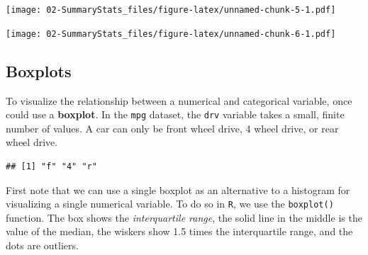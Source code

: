 \documentclass[]{book}
\newenvironment{Shaded}{\begin{snugshade}}{\end{snugshade}}
\newcommand{\KeywordTok}[1]{\textcolor[rgb]{0.13,0.29,0.53}{\textbf{#1}}}
\newcommand{\DataTypeTok}[1]{\textcolor[rgb]{0.13,0.29,0.53}{#1}}
\newcommand{\StringTok}[1]{\textcolor[rgb]{0.31,0.60,0.02}{#1}}
\newcommand{\OperatorTok}[1]{\textcolor[rgb]{0.81,0.36,0.00}{\textbf{#1}}}
\newcommand{\NormalTok}[1]{#1}
\begin{document}
\texttt{[image: 02-SummaryStats\_files/figure-latex/unnamed-chunk-5-1.pdf]}

\begin{Shaded}
\end{Shaded}

\texttt{[image: 02-SummaryStats\_files/figure-latex/unnamed-chunk-6-1.pdf]}

\subsection{Boxplots}\label{boxplots}

To visualize the relationship between a numerical and categorical
variable, once could use a \textbf{boxplot}. In the \texttt{mpg}
dataset, the \texttt{drv} variable takes a small, finite number of
values. A car can only be front wheel drive, 4 wheel drive, or rear
wheel drive.

\begin{Shaded}
\end{Shaded}

\begin{verbatim}
## [1] "f" "4" "r"
\end{verbatim}

First note that we can use a single boxplot as an alternative to a
histogram for visualizing a single numerical variable. To do so in
\texttt{R}, we use the \texttt{boxplot()} function. The box shows the
\emph{interquartile range}, the solid line in the middle is the value of
the median, the wiskers show 1.5 times the interquartile range, and the
dots are outliers.

\begin{Shaded}
\end{Shaded}
\end{document}

